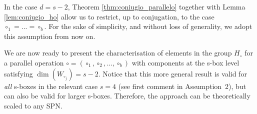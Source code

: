 \documentclass[runningheads,a4paper,english]{llncs}
\begin{document}
\begin{remark}
	\label{rmk:una_sola_somma}
	In the case $d = s-2$, Theorem \ref{thm:coniugio_parallelo} together with Lemma \ref{lem:coniugio_ho} allow us to restrict, up to conjugation, to the case $\circ_1 = ... = \circ_b$. For the sake of simplicity, and without loss of generality, we adopt this assumption from now on.
\end{remark}
We are now ready to present the characterisation of elements in the group $H_\circ$  for a parallel operation $\circ = (\circ_{1}, \circ_{2}, \dots, \circ_{b})$ with components at the s-box level satisfying $\dim(W_{\circ_j}) = s-2$. 
Notice that this more general result is valid for \emph{all} s-boxes in the relevant case  $s=4$ (see first comment in Assumption~2), but can also be valid for larger s-boxes. Therefore, the approach can be theoretically scaled to any SPN.
\end{document}
